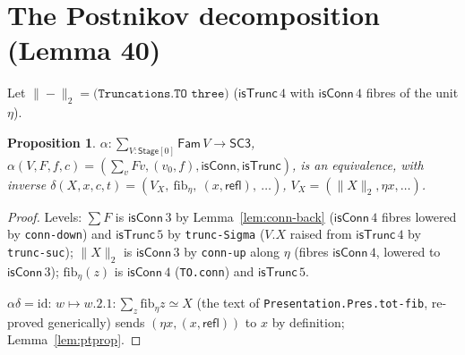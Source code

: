 \documentclass[11pt]{amsart}
\newtheorem{proposition}[theorem]{Proposition}
\theoremstyle{definition}
\theoremstyle{remark}
\newcommand{\code}[1]{\texttt{#1}}
\newcommand{\cT}{\mathsf{isTrunc}}
\newcommand{\cC}{\mathsf{isConn}}
\newcommand{\refl}{\mathsf{refl}}
\newcommand{\fib}{\mathrm{fib}}
\newcommand{\tr}[1]{\|#1\|}
\newcommand{\St}{\mathsf{Stage}}
\newcommand{\SC}{\mathsf{SC3}}
\newcommand{\Fam}{\mathsf{Fam}}
\begin{document}
\section{The Postnikov decomposition (Lemma 40)}

Let $\tr{-}_2=\code{(Truncations.TO three)}$ ($\cT\,4$ with $\cC\,4$ fibres of the unit $\eta$).

\begin{proposition}\label{prop:post}
$\alpha:\sum_{V:\St[0]}\Fam\,V\to\SC$, $\alpha(V,F,f,c)=(\sum_vFv,(v_0,f),\cC,\cT)$, is an equivalence,
with inverse $\delta(X,x,c,t)=(V_X,\ \fib_\eta,\ (x,\refl),\ \ldots)$, $V_X=(\tr X_2,\eta x,\ldots)$.
\end{proposition}
\begin{proof}
Levels: $\sum F$ is $\cC\,3$ by Lemma~\ref{lem:conn-back} ($\cC\,4$ fibres lowered by
\code{conn-down}) and $\cT\,5$ by \code{trunc-Sigma} ($V.X$ raised from $\cT\,4$ by \code{trunc-suc});
$\tr X_2$ is $\cC\,3$ by \code{conn-up} along $\eta$ (fibres $\cC\,4$, lowered to $\cC\,3$);
$\fib_\eta(z)$ is $\cC\,4$ (\code{TO.conn}) and $\cT\,5$.

$\alpha\delta=\mathrm{id}$: $w\mapsto w.2.1:\sum_z\fib_\eta z\simeq X$ (the text of
\code{Presentation.Pres.tot-fib}, re-proved generically) sends $(\eta x,(x,\refl))$ to $x$ by
definition; Lemma~\ref{lem:ptprop}.


\end{proof}
\end{document}
